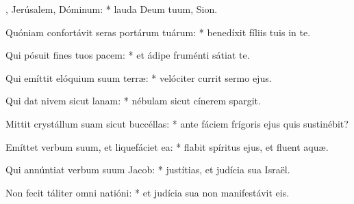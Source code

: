 \begin{psalmus}

    , Jerúsalem, Dó\-mi\-num: * lauda Deum tuum, Sion.

    Quóniam confortávit seras portárum tuárum: * benedíxit fíliis tuis in te.

    Qui pósuit fines tuos pacem: * et ádipe fruménti sátiat te.

    Qui emíttit elóquium suum terræ: * velóciter currit sermo ejus.

    Qui dat nivem sicut lanam: * nébulam sicut cínerem spargit.

    Mittit crystállum suam sicut buccéllas: * ante fáciem frígoris ejus quis sustinébit?

    Emíttet verbum suum, et liquefáciet ea: * flabit spíritus ejus, et fluent aquæ.

    Qui annúntiat verbum suum Jacob: * justítias, et judícia sua Israël.

    Non fecit táliter omni natióni: * et judícia sua non manifestávit eis.

\end{psalmus}
